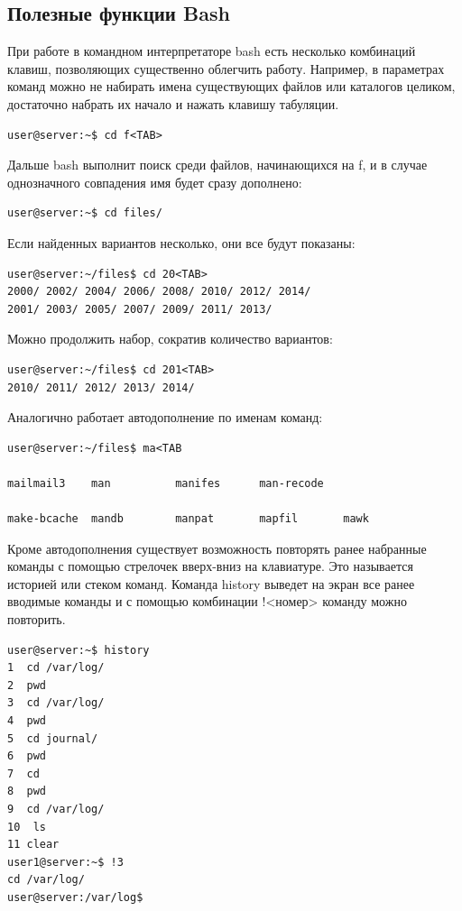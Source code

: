 \documentclass[14pt, a4paper]{article}
\begin{document}
\subsection*{Полезные функции Bash}

При работе в командном интерпретаторе bash есть несколько комбинаций клавиш,
позволяющих существенно облегчить работу. Например, в параметрах команд можно не набирать
имена существующих файлов или каталогов целиком, достаточно набрать их начало и нажать
клавишу табуляции.

\begin{lstlisting}
user@server:~$ cd f<TAB>
\end{lstlisting}

Дальше bash выполнит поиск среди файлов, начинающихся на f, и в случае однозначного
совпадения имя будет сразу дополнено:

\begin{lstlisting}
user@server:~$ cd files/
\end{lstlisting}

Если найденных вариантов несколько, они все будут показаны:

\begin{lstlisting}
user@server:~/files$ cd 20<TAB>
2000/ 2002/ 2004/ 2006/ 2008/ 2010/ 2012/ 2014/
2001/ 2003/ 2005/ 2007/ 2009/ 2011/ 2013/
\end{lstlisting}

Можно продолжить набор, сократив количество вариантов:
\begin{lstlisting}
user@server:~/files$ cd 201<TAB>
2010/ 2011/ 2012/ 2013/ 2014/
\end{lstlisting}

Аналогично работает автодополнение по именам команд:

\begin{lstlisting}
user@server:~/files$ ma<TAB

mailmail3    man          manifes      man-recode
    
make-bcache  mandb        manpat       mapfil       mawk    
\end{lstlisting}

Кроме автодополнения существует возможность повторять ранее набранные команды с
помощью стрелочек вверх-вниз на клавиатуре. Это называется историей или стеком команд. Команда
history выведет на экран все ранее вводимые команды и с помощью комбинации !<номер> команду
можно повторить.

\begin{lstlisting}
user@server:~$ history
1  cd /var/log/
2  pwd
3  cd /var/log/
4  pwd
5  cd journal/
6  pwd
7  cd
8  pwd
9  cd /var/log/
10  ls
11 clear
user1@server:~$ !3
cd /var/log/
user@server:/var/log$
\end{lstlisting}
\end{document}
